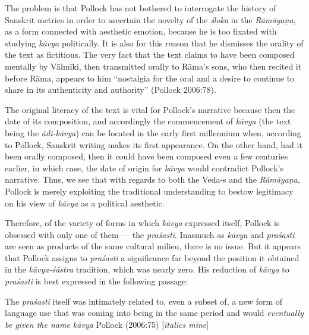 The problem is that Pollock has not bothered to interrogate the history of Sanskrit metrics in order to ascertain the novelty of the \textsl{śloka} in the \textsl{Rāmāyaṇa}, as a form connected with aesthetic emotion, because he is too fixated with studying \textsl{kāvya} politically. It is also for this reason that he dismisses the orality of the text as fictitious. The very fact that the text claims to have been composed mentally by Vālmīki, then transmitted orally to Rāma's sons, who then recited it before Rāma, appears to him ``nostalgia for the oral and a desire to continue to share in its authenticity and authority'' (Pollock 2006:78). 

The original literacy of the text is vital for Pollock's narrative because then the date of its composition, and accordingly the commencement of \textsl{kāvya} (the text being the \textsl{ādi-kāvya}) can be located in the early first millennium when, according to Pollock, Sanskrit writing makes its first appearance. On the other hand, had it been orally composed, then it could have been composed even a few centuries earlier, in which case, the date of origin for \textsl{kāvya} would contradict Pollock's narrative. Thus, we see that with regards to both the Veda-s and the \textsl{Rāmāyaṇa}, Pollock is merely exploiting the traditional understanding to bestow legitimacy on his view of \textsl{kāvya} as a political aesthetic.

Therefore, of the variety of forms in which \textsl{kāvya} expressed itself, Pollock is obsessed with only one of them --- the \textsl{praśasti}. Inasmuch as \textsl{kāvya} and \textsl{praśasti} are seen as products of the same cultural milieu, there is no issue. But it appears that Pollock assigns to \textsl{praśasti} a significance far beyond the position it obtained in the \textsl{kāvya-śāstra} tradition, which was nearly zero. His reduction of \textsl{kāvya} to \textsl{praśasti} is best expressed in the following passage:

\begin{myquote}
The \textsl{praśasti} itself was intimately related to, even a subset of, a new form of language use that was coming into being in the same period and would \textsl{eventually be given the name kāvya} 
\hfill Pollock (2006:75) [\textsl{italics mine}]
\end{myquote}

